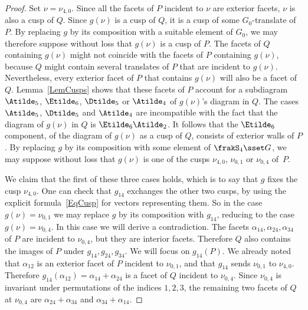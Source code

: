 \begin{proof}
Set $\nu=\nu_{4,0}$. Since all the facets of $P$ incident to $\nu$ are exterior facets, $\nu$ is also a cusp of $Q$. Since $g(\nu)$ is a cusp of $Q$, it is a cusp of some $G_0$-translate of $P$. By replacing $g$ by its composition with a suitable element of $G_0$, we may therefore suppose without loss that $g(\nu)$ is a cusp of $P$. The facets of $Q$ containing $g(\nu)$ might not coincide with the facets of $P$ containing $g(\nu)$, because $Q$ might contain several translates of $P$ that are incident to $g(\nu)$. Nevertheless, every exterior facet of $P$ that contains $g(\nu)$ will also be a facet of $Q$. Lemma~\ref{LemCusps} shows that these facets of $P$ account for a subdiagram $\Atilde_5$, $\Etilde_6$, $\Dtilde_5$ or $\Atilde_4$ of $g(\nu)$'s diagram in $Q$. The cases $\Atilde_5$, $\Dtilde_5$ and $\Atilde_4$ are incompatible with the fact that the diagram of $g(\nu)$ in $Q$ is $\Etilde_6\Atilde_2$. It follows that the $\Etilde_6$ component, of the diagram of $g(\nu)$ as a cusp of $Q$, consists of exterior walls of $P$. By replacing $g$ by its composition with some element of $\frakS_4\sset G$, we may suppose without loss that $g(\nu)$ is one of the cusps $\nu_{4,0}$, $\nu_{0,1}$ or $\nu_{0,4}$ of~$P$.

We claim that the first of these three cases holds, which is to say that $g$ fixes the cusp $\nu_{4,0}$. One can check that $g_{14}$ exchanges the other two cusps, by using the explicit formula~\eqref{EqCusp} for vectors representing them. So in the case $g(\nu)=\nu_{0,1}$ we may replace $g$ by its composition with $g_{14}$, reducing to the case $g(\nu)=\nu_{0,4}$. In this case we will derive a contradiction. The facets $\alpha_{14},\alpha_{24},\alpha_{34}$ of $P$ are incident to $\nu_{0,4}$, but they are interior facets. Therefore $Q$ also contains the images of $P$ under $g_{14},g_{24},g_{34}$. We will focus on $g_{14}(P)$. We already noted that $\alpha_{12}$ is an exterior facet of $P$ incident to $\nu_{0,1}$, and that $g_{14}$ sends $\nu_{0,1}$ to $\nu_{4,0}$. Therefore $g_{14}(\alpha_{12})=\alpha_{14}+\alpha_{24}$ is a facet of $Q$ incident to $\nu_{0,4}$. Since $\nu_{0,4}$ is invariant under permutations of the indices $1,2,3$, the remaining two facets of $Q$ at $\nu_{0,4}$ are $\alpha_{24}+\alpha_{34}$ and $\alpha_{34}+\alpha_{14}$.


\end{proof}
